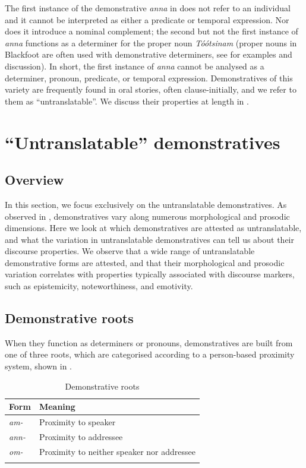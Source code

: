 \documentclass[output=paper,colorlinks,citecolor=brown]{langscibook}
\begin{document}
The first instance of the demonstrative \textit{anna} in  does not refer to an individual and it cannot be interpreted as either a predicate or temporal expression. Nor does it introduce a nominal complement; the second but not the first instance of \textit{anna} functions as a determiner for the proper noun \textit{Tóótsinam} (proper nouns in Blackfoot are often used with demonstrative determiners, see \citet{Bliss2013} for examples and discussion). In short, the first instance of \textit{anna} cannot be analysed as a determiner, pronoun, predicate, or temporal expression. Demonstratives of this variety are frequently found in oral stories, often clause-initially, and we refer to them as “untranslatable”. We discuss their properties at length in . 

\section{“Untranslatable” demonstratives}\label{sec:bliss:4}

\subsection{Overview}\label{sec:bliss:4.1}

In this section, we focus exclusively on the untranslatable demonstratives. As observed in , demonstratives vary along numerous morphological and prosodic dimensions. Here we look at which demonstratives are attested as untranslatable, and what the variation in untranslatable demonstratives can tell us about their discourse properties. We observe that a wide range of untranslatable demonstrative forms are attested, and that their morphological and prosodic variation correlates with properties typically associated with discourse markers, such as epistemicity, noteworthiness, and emotivity. 

\subsection{Demonstrative roots}\label{sec:bliss:4.2}

When they function as determiners or pronouns, demonstratives are built from one of three roots, which are categorised according to a person-based proximity system, shown in .

\begin{table}
\begin{tabularx}{\textwidth}{Xl}
\lsptoprule
\textbf{Form} & \textbf{Meaning}\\
\midrule
\textit{am-} & Proximity to speaker\\
\textit{ann-} & Proximity to addressee\\
\textit{om-} & Proximity to neither speaker nor addressee\\
\lspbottomrule
\end{tabularx}
\caption{Demonstrative roots}
\label{tab:bliss:1}
\end{table}
\end{document}
